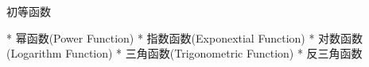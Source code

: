 初等函数


* 幂函数(Power Function)
* 指数函数(Exponextial Function)
* 对数函数(Logarithm Function)
* 三角函数(Trigonometric Function)
* 反三角函数
